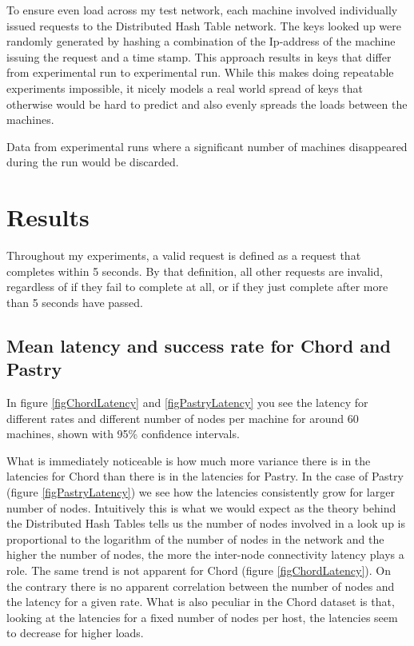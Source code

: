 \mbox{}
To ensure even load across my test network, each machine involved individually issued requests to the Distributed Hash Table network.
The keys looked up were randomly generated by hashing a combination of the Ip-address of the machine issuing the request and a time stamp. This approach results in keys that differ from experimental run to experimental run. While this makes doing repeatable experiments impossible, it nicely models a real world spread of keys that otherwise would be hard to predict and also evenly spreads the loads between the machines.

Data from experimental runs where a significant number of machines disappeared during the run would be discarded.


\section{Results}
Throughout my experiments, a valid request is defined as a request that completes within 5 seconds. By that definition, all other requests are invalid, regardless of if they fail to complete at all, or if they just complete after more than 5 seconds have passed.

\subsection{Mean latency and success rate for Chord and Pastry}
In figure \ref{figChordLatency} and \ref{figPastryLatency} you see the latency for different rates and different number of nodes per machine for around 60 machines, shown with 95\% confidence intervals. 

What is immediately noticeable is how much more variance there is in the latencies for Chord than there is in the latencies for Pastry.
In the case of Pastry (figure \ref{figPastryLatency}) we see how the latencies consistently grow for larger number of nodes. Intuitively this is what we would expect as the theory behind the Distributed Hash Tables tells us the number of nodes involved in a look up is proportional to the logarithm of the number of nodes in the network and the higher the number of nodes, the more the inter-node connectivity latency plays a role. The same trend is not apparent for Chord (figure \ref{figChordLatency}). On the contrary there is no apparent correlation between the number of nodes and the latency for a given rate. What is also peculiar in the Chord dataset is that, looking at the latencies for a fixed number of nodes per host, the latencies seem to decrease for higher loads.

